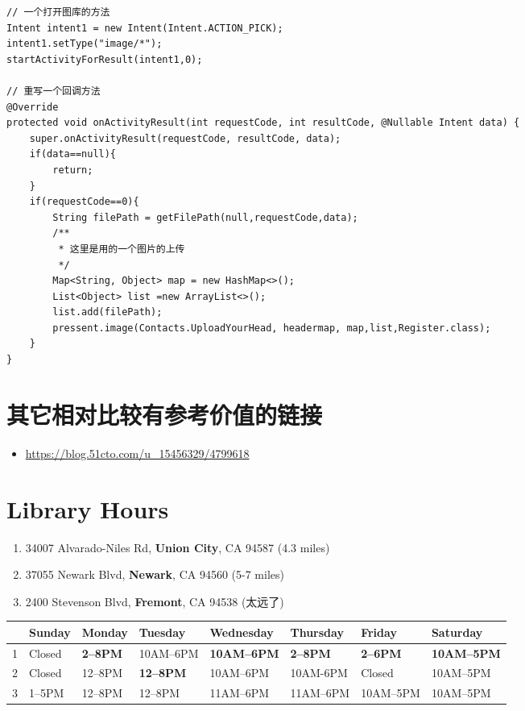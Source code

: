 \documentclass[9pt, b5paper]{article}
\begin{document}
\begin{verbatim}
// 一个打开图库的方法
Intent intent1 = new Intent(Intent.ACTION_PICK);
intent1.setType("image/*");
startActivityForResult(intent1,0);

// 重写一个回调方法
@Override
protected void onActivityResult(int requestCode, int resultCode, @Nullable Intent data) {
    super.onActivityResult(requestCode, resultCode, data);
    if(data==null){
        return;
    }
    if(requestCode==0){
        String filePath = getFilePath(null,requestCode,data);
        /**
         * 这里是用的一个图片的上传
         */
        Map<String, Object> map = new HashMap<>();
        List<Object> list =new ArrayList<>();
        list.add(filePath);
        pressent.image(Contacts.UploadYourHead, headermap, map,list,Register.class);
    }
}
\end{verbatim}

\section{其它相对比较有参考价值的链接}
\label{sec-12}
\begin{itemize}
\item \url{https://blog.51cto.com/u_15456329/4799618}
\end{itemize}

\section{Library Hours}
\label{sec-13}
\begin{enumerate}
\item 34007 Alvarado-Niles Rd, \textbf{Union City}, CA 94587 (4.3 miles)
\item 37055 Newark Blvd, \textbf{Newark}, CA 94560 (5-7 miles)
\item 2400 Stevenson Blvd, \textbf{Fremont}, CA 94538 (太远了)
\end{enumerate}
\begin{center}
\begin{tabular}{rlllllll}
\hline
 & Sunday & Monday & Tuesday & Wednesday & Thursday & Friday & Saturday\\
\hline
1 & Closed & \textbf{2–8PM} & 10AM–6PM & \textbf{10AM–6PM} & \textbf{2–8PM} & \textbf{2–6PM} & \textbf{10AM–5PM}\\
2 & Closed & 12–8PM & \textbf{12–8PM} & 10AM–6PM & 10AM-6PM & Closed & 10AM–5PM\\
3 & 1–5PM & 12–8PM & 12–8PM & 11AM–6PM & 11AM–6PM & 10AM–5PM & 10AM–5PM\\
\end{tabular}
\end{center}
\end{document}
